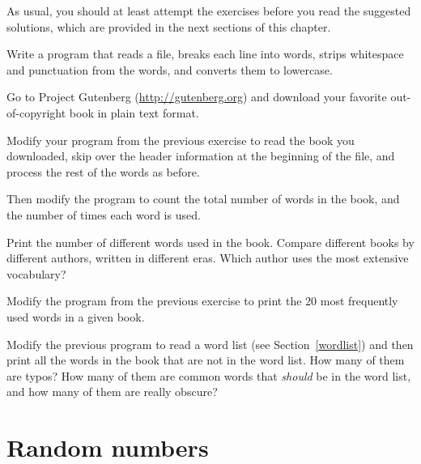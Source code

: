 As usual, you should at least attempt the exercises
before you read the suggested solutions, which are 
provided in the next sections of this chapter.

\begin{exercise}

Write a program that reads a file, breaks each line into
words, strips whitespace and punctuation from the words, and
converts them to lowercase.

\end{exercise}


\begin{exercise}

Go to Project Gutenberg (\url{http://gutenberg.org}) and download 
your favorite out-of-copyright book in plain text format.

Modify your program from the previous exercise to read the book
you downloaded, skip over the header information at the beginning
of the file, and process the rest of the words as before.

Then modify the program to count the total number of words in
the book, and the number of times each word is used.

Print the number of different words used in the book.  Compare
different books by different authors, written in different eras.
Which author uses the most extensive vocabulary?
\end{exercise}


\begin{exercise}

Modify the program from the previous exercise to print the
20 most frequently used words in a given book.

\end{exercise}


\begin{exercise}

Modify the previous program to read a word list (see
Section~\ref{wordlist}) and then print all the words in the book that
are not in the word list.  How many of them are typos?  How many of
them are common words that {\em should} be in the word list, and how
many of them are really obscure?

\end{exercise}


\section{Random numbers}

